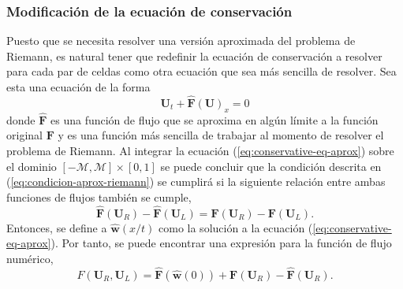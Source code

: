 \subsubsection{Modificación de la ecuación de conservación}
Puesto que se necesita resolver una versión aproximada del problema de Riemann, es natural tener que redefinir la ecuación de conservación a resolver para cada par de celdas como otra ecuación que sea más sencilla de resolver. Sea esta una ecuación de la forma 
\begin{equation}
	\mathbf{U}_t + \mathbf{\hat{F}}(\mathbf{U})_x = 0
	\label{eq:conservative-eq-aprox}
\end{equation}
donde $\mathbf{\hat{F}}$ es una función de flujo que se aproxima en algún límite a la función original $\mathbf{{F}}$ y es una función más sencilla de trabajar al momento de resolver el problema de Riemann. Al integrar la ecuación (\ref{eq:conservative-eq-aprox}) sobre el dominio $[-\mathcal{M}, \mathcal{M}] \times [0,1]$ se puede concluir que la condición descrita en (\ref{eq:condicion-aprox-riemann}) se cumplirá si la siguiente relación entre ambas funciones de flujos también se cumple,
\begin{equation}
	\mathbf{\hat{F}}(\mathbf{U}_R) - \mathbf{\hat{F}}(\mathbf{U}_L) = \mathbf{F}(\mathbf{U}_R) - \mathbf{F}(\mathbf{U}_L).
	\label{eq:flux-differences-condition}
\end{equation}
Entonces, se define a $\mathbf{\hat{w}}(x/t)$ como la solución a la ecuación (\ref{eq:conservative-eq-aprox}). Por tanto, se puede encontrar una expresión para la función de flujo numérico,
\begin{equation}
	F(\mathbf{U}_R, \mathbf{U}_L) = \mathbf{\hat{F}}({\mathbf{\hat{w}}}(0)) +  \mathbf{F}(\mathbf{U}_R)-\mathbf{\hat{F}}(\mathbf{U}_R).
	\label{eq:numerical-aprox-flux}
\end{equation}
